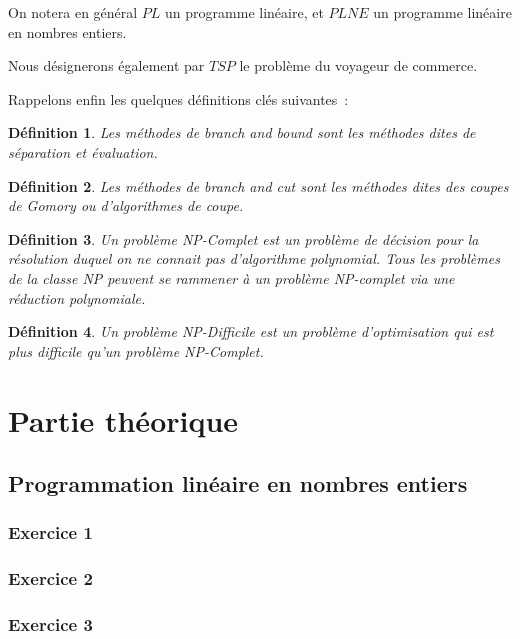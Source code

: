 \documentclass[a4paper, 12pt]{article}
\newtheorem{mydef}{Définition}
\begin{document}
On notera en général $PL$ un programme linéaire, et $PLNE$ un
programme linéaire en nombres entiers. 


Nous désignerons également par $TSP$ le problème du voyageur de
commerce.


Rappelons enfin les quelques définitions clés suivantes~:
\begin{mydef}
Les méthodes de branch and bound sont les méthodes dites de séparation
et évaluation.
\end{mydef}

\begin{mydef}
Les méthodes de branch and cut sont les méthodes dites des coupes de
Gomory ou d'algorithmes de coupe.
\end{mydef}

\begin{mydef}
Un problème NP-Complet est un problème de décision pour la résolution duquel on ne
connait pas d'algorithme polynomial. Tous les problèmes de la classe
NP peuvent se rammener à un problème NP-complet via une réduction polynomiale.
\end{mydef}

\begin{mydef}
Un problème NP-Difficile est un problème d'optimisation qui est plus
difficile qu'un problème NP-Complet.
\end{mydef}

\pagebreak

\section{Partie théorique}

\subsection{Programmation linéaire en nombres entiers}

\subsubsection*{Exercice 1}


\subsubsection*{Exercice 2}


\subsubsection*{Exercice 3}

\end{document}
